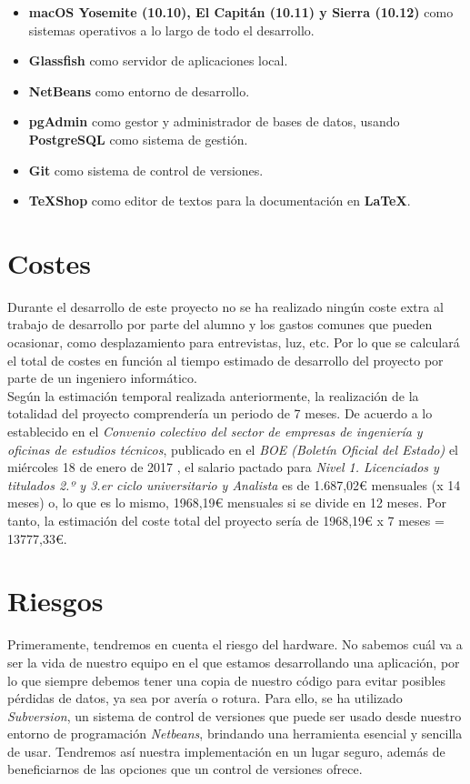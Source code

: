 \begin{itemize}
\item \textbf{macOS Yosemite (10.10), El Capitán (10.11) y Sierra (10.12)} como sistemas operativos a lo largo de todo el desarrollo.
\item \textbf{Glassfish} como servidor de aplicaciones local.
\item \textbf{NetBeans} como entorno de desarrollo.
\item \textbf{pgAdmin} como gestor y administrador de bases de datos, usando \textbf{PostgreSQL} como sistema de gestión.
\item \textbf{Git} como sistema de control de versiones.
\item \textbf{TeXShop} como editor de textos para la documentación en \textbf{LaTeX}.
\end{itemize}


\section{Costes}

Durante el desarrollo de este proyecto no se ha realizado ningún coste extra al trabajo de desarrollo por parte del alumno y los gastos comunes que pueden ocasionar, como desplazamiento para entrevistas, luz, etc. Por lo que se calculará el total de costes en función al tiempo estimado de desarrollo del proyecto por parte de un ingeniero informático.\\

Según la estimación temporal realizada anteriormente, la realización de la totalidad del proyecto comprendería un periodo de 7 meses. De acuerdo a lo establecido en el \textit{Convenio colectivo del sector de empresas de ingeniería y oficinas de estudios técnicos}, publicado en el \textit{BOE (Boletín Oficial del Estado)} el miércoles 18 de enero de 2017 \cite{BOE18ene17}, el salario pactado para \textit{Nivel 1. Licenciados y titulados 2.º y 3.er ciclo universitario y Analista} es de 1.687,02€ mensuales (x 14 meses) o, lo que es lo mismo, 1968,19€ mensuales si se divide en 12 meses. Por tanto, la estimación del coste total del proyecto sería de 1968,19€ x 7 meses = 13777,33€.


\section{Riesgos}

Primeramente, tendremos en cuenta el riesgo del hardware. No sabemos cuál va a ser la vida de nuestro equipo en el que estamos desarrollando una aplicación, por lo que siempre debemos tener una copia de nuestro código para evitar posibles pérdidas de datos, ya sea por avería o rotura. Para ello, se ha utilizado \textit{Subversion}, un sistema de control de versiones que puede ser usado desde nuestro entorno de programación \textit{Netbeans}, brindando una herramienta esencial y sencilla de usar. Tendremos así nuestra implementación en un lugar seguro, además de beneficiarnos de las opciones que un control de versiones ofrece.
\\

